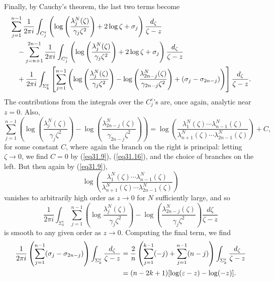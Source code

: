 \documentclass{surv-l}
\theoremstyle{plain}
\theoremstyle{definition}
\numberwithin{equation}{chapter}
\begin{document}
Finally, by Cauchy's theorem, the last two terms become
\begin{align*}
&\sum_{j=1}^{n-1}\frac{1}{2\pi i}\int_{C_{j}^{\varepsilon}}\left(\log\left(\frac{\lambda_{j}^{N}(\zeta)}{\gamma_{j}\zeta^{2}}\right)+2\log\zeta+\sigma_{j}\right)\frac{d_{\zeta}}{\zeta-z}\\ \notag
&\quad -\sum_{j=n+1}^{2n-1}\frac{1}{2\pi i}\int_{C_{j}^{\varepsilon}}\left(\log\left(\frac{\lambda_{j}^{N}(\zeta)}{\gamma_{j}\zeta^{2}}\right) +2\log\zeta+\sigma_{j}\right)\frac{d_{\zeta}}{\zeta-z}\\ \notag
&\quad +\frac{1}{2\pi i}\int_{\Sigma_{k}^{\varepsilon}}\left[\sum_{j=1}^{n-1}\left(\log\left(\frac{\lambda_{j}^{N}(\zeta)}{\gamma_{j}\zeta^{2}}\right)-\log\left(\frac{\lambda_{2n-j}^{N}(\zeta)}{\gamma_{2n-j}\zeta^{2}}\right) +(\sigma_{j}-\sigma_{2n-j})\right)\right]\frac{d_{\zeta}}{\zeta-z}.
\end{align*}
The contributions from the integrals over the $C_{j}^{\varepsilon}$'s are, once again, analytic near $z=0$. Also,
\begin{equation*}
 \sum_{j=1}^{n-1}\left(\log\left(\frac{\lambda_{j}^{N}(\zeta)}{\gamma_{j}\zeta^{2}}\right)-\log\left(\frac{\lambda_{2n-j}^{N}(\zeta)}{\gamma_{2n-j}\zeta^{2}}\right)\right)=\log\left(\frac{\lambda_{1}^{N}(\zeta)\cdots\lambda_{n-1}^{N}(\zeta)}{\lambda_{n+1}^{N}(\zeta)\cdots\lambda_{2n-1}^{N}(\zeta)}\right)+C,
 \end{equation*}
for some constant $C$, where again the branch on the right is principal: letting $\zeta\rightarrow 0$, we find $C=0$ by (\ref{eq31.9}), (\ref{eq31.16}), and the choice of branches on the left. But then again by (\ref{eq31.9}),
\begin{equation*}
\log\left(\frac{\lambda_{1}^{N}(\zeta)\cdots\lambda_{n-1}^{N}(\zeta)}{\lambda_{n+1}^{N}
(\zeta)\cdots\lambda_{2n-1}^{N}(\zeta)}\right)
\end{equation*}
vanishes to arbitrarily high order as $z\rightarrow 0$ for $N$ sufficiently large, and so
\begin{equation*}
\frac{1}{2\pi i}\int_{\Sigma_{k}^{\varepsilon}}\sum_{j=1}^{n-1}\left(\log\frac{\lambda_{j}^{N}(\zeta)}{\gamma_{j}\zeta^{2}}\right)-\log\left(\frac{\lambda_{2n-j}^{N}(\zeta)}{\gamma_{j}\zeta^{2}}\right)\frac{d{\zeta}}{\zeta-z}
\end{equation*}
is smooth to any given order as $z\rightarrow 0$. Computing the final term, we find
\begin{align*}
 \frac{1}{2\pi i}\left(\sum_{j=1}^{n-1}(\sigma_{j}-\sigma_{2n-j})\right)\int_{\Sigma_{k}^{\varepsilon}}\frac{d_{\zeta}}{\zeta-z}&=\frac{2}{n}\left(\sum_{j=1}^{k-1}(-j)+\sum_{j=1}^{n-1}(n-j)\right)\int_{\Sigma_{k}^{\varepsilon}}\frac{d_{\zeta}}{\zeta-z}\\ \notag
&=(n-2k+1)[\log(\varepsilon-z)-\log(-z)].
\end{align*}
\end{document}

